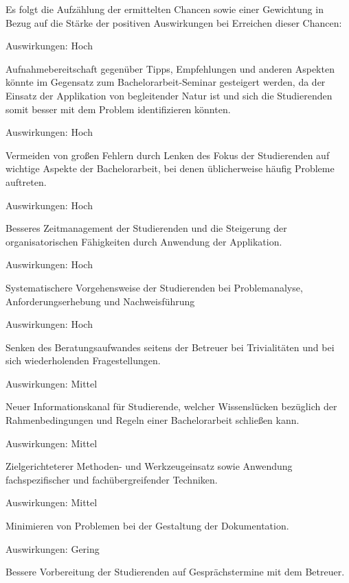 \documentclass[bibliography=totoc,listof=totoc,BCOR=5mm,DIV=12,oneside]{scrbook}
\begin{document}
\par \bigskip Es folgt die Aufzählung der ermittelten Chancen sowie einer Gewichtung in Bezug auf die Stärke der positiven Auswirkungen bei Erreichen dieser Chancen:

\begin{enumerate} [label=\textit{[C\arabic*]}]
\item 
\par Auswirkungen: Hoch
\par Aufnahmebereitschaft gegenüber Tipps, Empfehlungen und anderen Aspekten könnte im Gegensatz zum Bachelorarbeit-Seminar gesteigert werden, da der Einsatz der Applikation von begleitender Natur ist und sich die Studierenden somit besser mit dem Problem identifizieren könnten.
\item
\par Auswirkungen: Hoch
\par Vermeiden von großen Fehlern durch Lenken des Fokus der Studierenden auf wichtige Aspekte der Bachelorarbeit, bei denen üblicherweise häufig Probleme auftreten.
\item
\par Auswirkungen: Hoch
\par Besseres Zeitmanagement der Studierenden und die Steigerung der organisatorischen Fähigkeiten durch Anwendung der Applikation.
\item
\par Auswirkungen: Hoch
\par Systematischere Vorgehensweise der Studierenden bei Problemanalyse, Anforderungserhebung und Nachweisführung
\item
\par Auswirkungen: Hoch
\par Senken des Beratungsaufwandes seitens der Betreuer bei Trivialitäten und bei sich wiederholenden Fragestellungen.
\item 
\par Auswirkungen: Mittel
\par Neuer Informationskanal für Studierende, welcher Wissenslücken bezüglich der Rahmenbedingungen und Regeln einer Bachelorarbeit schließen kann.
\item
\par Auswirkungen: Mittel
\par Zielgerichteterer Methoden- und Werkzeugeinsatz sowie Anwendung fachspezifischer und fachübergreifender Techniken.
\item
\par Auswirkungen: Mittel
\par Minimieren von Problemen bei der Gestaltung der Dokumentation.
\item
\par Auswirkungen: Gering
\par Bessere Vorbereitung der Studierenden auf Gesprächstermine mit dem Betreuer.
\end{enumerate}
\end{document}
